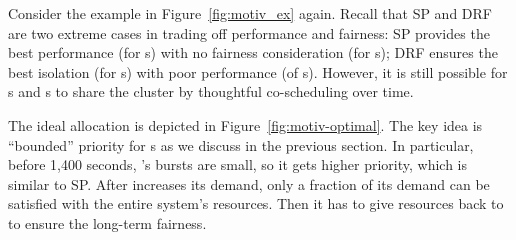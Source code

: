 
Consider the example in Figure~\ref{fig:motiv_ex} again. Recall that SP and DRF are two extreme cases in trading off performance and fairness: SP provides the best performance (for {\burstq}s) with no fairness consideration (for {\batchq}s); DRF ensures the best isolation (for {\batchq}s) with poor performance (of {\burstq}s). 
However, it is still possible for {\burstq}s and {\batchq}s to share the cluster by thoughtful co-scheduling over time.

The ideal allocation is depicted in Figure~\ref{fig:motiv-optimal}. 
The key idea is ``bounded'' priority for {\burstq}s as we discuss in the previous section. 
In particular, before 1,400 seconds, \burstq's bursts are small, so it gets higher priority, which is similar to SP. 
After \burstq increases its demand, only a fraction of its demand can be satisfied with the entire system's resources. Then it has to give resources back to \batchq to ensure the long-term fairness.

